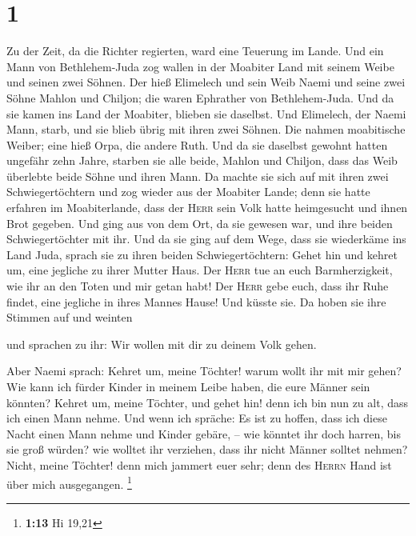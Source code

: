 \hypertarget{section}{%
\section{1}\label{section}}

 Zu der Zeit, da die Richter regierten, ward eine Teuerung
im Lande. Und ein Mann von Bethlehem-Juda zog wallen in der Moabiter
Land mit seinem Weibe und seinen zwei Söhnen.  Der hieß
Elimelech und sein Weib Naemi und seine zwei Söhne Mahlon und Chiljon;
die waren Ephrather von Bethlehem-Juda. Und da sie kamen ins Land der
Moabiter, blieben sie daselbst.  Und Elimelech, der Naemi
Mann, starb, und sie blieb übrig mit ihren zwei Söhnen. 
Die nahmen moabitische Weiber; eine hieß Orpa, die andere Ruth. Und da
sie daselbst gewohnt hatten ungefähr zehn Jahre,  starben
sie alle beide, Mahlon und Chiljon, dass das Weib überlebte beide Söhne
und ihren Mann.  Da machte sie sich auf mit ihren zwei
Schwiegertöchtern und zog wieder aus der Moabiter Lande; denn sie hatte
erfahren im Moabiterlande, dass der \textsc{Herr} sein Volk hatte
heimgesucht und ihnen Brot gegeben.  Und ging aus von dem
Ort, da sie gewesen war, und ihre beiden Schwiegertöchter mit ihr. Und
da sie ging auf dem Wege, dass sie wiederkäme ins Land Juda,
 sprach sie zu ihren beiden Schwiegertöchtern: Gehet hin
und kehret um, eine jegliche zu ihrer Mutter Haus. Der \textsc{Herr} tue
an euch Barmherzigkeit, wie ihr an den Toten und mir getan habt!
 Der \textsc{Herr} gebe euch, dass ihr Ruhe findet, eine
jegliche in ihres Mannes Hause! Und küsste sie. Da hoben sie ihre
Stimmen auf und weinten

 und sprachen zu ihr: Wir wollen mit dir zu deinem Volk
gehen.

 Aber Naemi sprach: Kehret um, meine Töchter! warum wollt
ihr mit mir gehen? Wie kann ich fürder Kinder in meinem Leibe haben, die
eure Männer sein könnten?  Kehret um, meine Töchter, und
gehet hin! denn ich bin nun zu alt, dass ich einen Mann nehme. Und wenn
ich spräche: Es ist zu hoffen, dass ich diese Nacht einen Mann nehme und
Kinder gebäre, --  wie könntet ihr doch harren, bis sie
groß würden? wie wolltet ihr verziehen, dass ihr nicht Männer solltet
nehmen? Nicht, meine Töchter! denn mich jammert euer sehr; denn des
\textsc{Herrn} Hand ist über mich ausgegangen. \footnote{\textbf{1:13}
  Hi 19,21}


